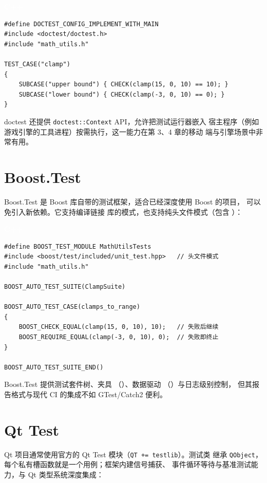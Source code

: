 \documentclass[12pt,a4paper,fontset=fandol]{ctexbook}
\newcommand{\cpplabel}{%
  \begin{tcolorbox}[enhanced,colback=cppheadbg,colframe=cppheadbg,
    arc=1mm,boxrule=0mm,left=6pt,right=6pt,top=2pt,bottom=2pt,
    halign=left,oversize]
    \textcolor{white}{\small\bfseries C++}
  \end{tcolorbox}\vspace{-4pt}}
\begin{document}
\cpplabel
\begin{lstlisting}
#define DOCTEST_CONFIG_IMPLEMENT_WITH_MAIN
#include <doctest/doctest.h>
#include "math_utils.h"

TEST_CASE("clamp")
{
    SUBCASE("upper bound") { CHECK(clamp(15, 0, 10) == 10); }
    SUBCASE("lower bound") { CHECK(clamp(-3, 0, 10) == 0); }
}
\end{lstlisting}

doctest 还提供 \texttt{doctest::Context} API，允许把测试运行器嵌入
宿主程序（例如游戏引擎的工具进程）按需执行，这一能力在第 3、4 章的移动
端与引擎场景中非常有用。

\section{Boost.Test}

Boost.Test 是 Boost 库自带的测试框架，适合已经深度使用 Boost 的项目，
可以免引入新依赖。它支持编译链接 
库的模式，也支持纯头文件模式（包含
）：

\cpplabel
\begin{lstlisting}
#define BOOST_TEST_MODULE MathUtilsTests
#include <boost/test/included/unit_test.hpp>   // 头文件模式
#include "math_utils.h"

BOOST_AUTO_TEST_SUITE(ClampSuite)

BOOST_AUTO_TEST_CASE(clamps_to_range)
{
    BOOST_CHECK_EQUAL(clamp(15, 0, 10), 10);   // 失败后继续
    BOOST_REQUIRE_EQUAL(clamp(-3, 0, 10), 0);  // 失败即终止
}

BOOST_AUTO_TEST_SUITE_END()
\end{lstlisting}

Boost.Test 提供测试套件树、夹具
（）、数据驱动
（）与日志级别控制，
但其报告格式与现代 CI 的集成不如 GTest/Catch2 便利。

\section{Qt Test}

Qt 项目通常使用官方的 Qt Test 模块（\texttt{QT += testlib}）。测试类
继承 \texttt{QObject}，每个私有槽函数就是一个用例；框架内建信号捕获、
事件循环等待与基准测试能力，与 Qt 类型系统深度集成：
\end{document}
